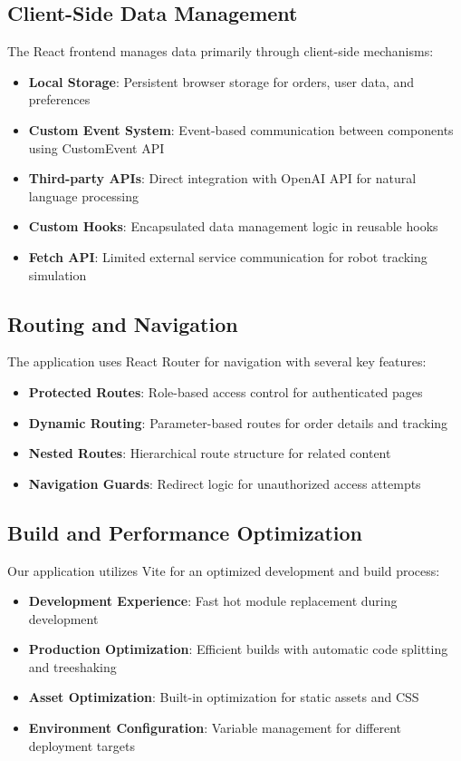 \documentclass[12pt]{article}
\begin{document}
\subsection{Client-Side Data Management}

The React frontend manages data primarily through client-side mechanisms:

\begin{itemize}
    \item \textbf{Local Storage}: Persistent browser storage for orders, user data, and preferences
    \item \textbf{Custom Event System}: Event-based communication between components using CustomEvent API
    \item \textbf{Third-party APIs}: Direct integration with OpenAI API for natural language processing
    \item \textbf{Custom Hooks}: Encapsulated data management logic in reusable hooks
    \item \textbf{Fetch API}: Limited external service communication for robot tracking simulation
\end{itemize}

\subsection{Routing and Navigation}

The application uses React Router for navigation with several key features:

\begin{itemize}
    \item \textbf{Protected Routes}: Role-based access control for authenticated pages
    \item \textbf{Dynamic Routing}: Parameter-based routes for order details and tracking
    \item \textbf{Nested Routes}: Hierarchical route structure for related content
    \item \textbf{Navigation Guards}: Redirect logic for unauthorized access attempts
\end{itemize}

\subsection{Build and Performance Optimization}

Our application utilizes Vite for an optimized development and build process:

\begin{itemize}
    \item \textbf{Development Experience}: Fast hot module replacement during development
    \item \textbf{Production Optimization}: Efficient builds with automatic code splitting and treeshaking
    \item \textbf{Asset Optimization}: Built-in optimization for static assets and CSS
    \item \textbf{Environment Configuration}: Variable management for different deployment targets
\end{itemize}
\end{document}
